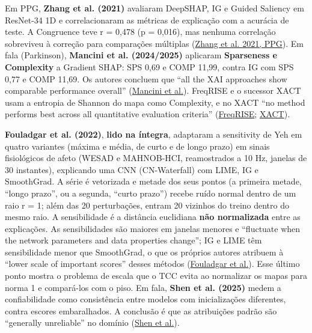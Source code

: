 \documentclass[11pt,a4paper]{article}
\begin{document}
Em PPG, \textbf{Zhang et al. (2021)} avaliaram DeepSHAP, IG e Guided Saliency em ResNet-34 1D e correlacionaram as métricas de explicação com a acurácia de teste. A Congruence teve r = 0,478 (p = 0,016), mas nenhuma correlação sobreviveu à correção para comparações múltiplas (\href{https://pmc.ncbi.nlm.nih.gov/articles/PMC7978398/}{Zhang et al. 2021, PPG}). Em fala (Parkinson), \textbf{Mancini et al. (2024/2025)} aplicaram \textbf{Sparseness e Complexity} a Gradient SHAP: SPS 0,69 e COMP 11,99, contra IG com SPS 0,77 e COMP 11,69. Os autores concluem que ``all the XAI approaches show comparable performance overall'' (\href{https://arxiv.org/abs/2411.08013}{Mancini et al.}). FreqRISE e o sucessor XACT usam a entropia de Shannon do mapa como Complexity, e no XACT ``no method performs best across all quantitative evaluation criteria'' (\href{https://arxiv.org/abs/2406.13584}{FreqRISE}; \href{https://arxiv.org/abs/2609.29270}{XACT}).

\textbf{Fouladgar et al. (2022)}, \textbf{lido na íntegra}, adaptaram a sensitivity de Yeh em quatro variantes (máxima e média, de curto e de longo prazo) em sinais fisiológicos de afeto (WESAD e MAHNOB-HCI, reamostrados a 10 Hz, janelas de 30 instantes), explicando uma CNN (CN-Waterfall) com LIME, IG e SmoothGrad. A série é vetorizada e metade dos seus pontos (a primeira metade, ``longo prazo'', ou a segunda, ``curto prazo'') recebe ruído normal dentro de um raio r = 1; além das 20 perturbações, entram 20 vizinhos do treino dentro do mesmo raio. A sensibilidade é a distância euclidiana \textbf{não normalizada} entre as explicações. As sensibilidades são maiores em janelas menores e ``fluctuate when the network parameters and data properties change''; IG e LIME têm sensibilidade menor que SmoothGrad, o que os próprios autores atribuem à ``lower scale of important scores'' desses métodos (\href{https://doi.org/10.1109/ACCESS.2022.3155115}{Fouladgar et al.}). Esse último ponto mostra o problema de escala que o TCC evita ao normalizar os mapas para norma 1 e compará-los com o piso. Em fala, \textbf{Shen et al. (2025)} medem a confiabilidade como consistência entre modelos com inicializações diferentes, contra escores embaralhados. A conclusão é que as atribuições padrão são ``generally unreliable'' no domínio (\href{https://arxiv.org/abs/2505.16406}{Shen et al.}).
\end{document}
